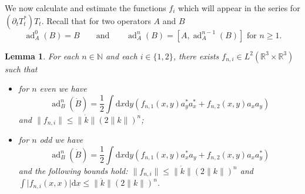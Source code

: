 \documentclass[11pt,a4paper,DIV11]{scrartcl}	%
\newtheorem{lem}[thm]{Lemma}
\newcommand{\ad}{\operatorname{ad}}	%
\newcommand{\di}{\textrm{d}}		%
\newcommand{\Rbb}{\mathbb{R}}		%
\newcommand{\Nbb}{\mathbb{N}}		%
\newcommand{\norm}[1]{\lVert#1\rVert}	%
\newcommand{\bd}{\begin{displaymath}}			%
\newcommand{\ed}{\end{displaymath}}
\begin{document}
We now calculate and estimate the functions $f_i$ which will appear in the series for $(\partial_t T^*_t)T_t$. Recall that for two operators $A$ and $B$
\[
 \ad^0_A(B) = B \qquad \mbox{and} \qquad \ad^n_A(B) = [A,\ad^{n-1}_A(B)] \mbox{ for } n \geq 1.
\]


\begin{lem}
\label{lm:highercommutators}
 For each $n \in \Nbb$ and each $i \in \{1,2\}$, there exists $f_{n,i} \in L^2(\Rbb^3 \times \Rbb^3)$ such that
\begin{itemize}
 \item for $n$ even we have
\bd
\ad^n_B(\dot B) = \frac{1}{2} \int \di x\di y\left( f_{n,1}(x,y) a^\ast_y a^\ast_x + f_{n,2}(x,y) a_x a_y \right)
\ed
and $\norm{f_{n,i}} \leq \norm{\dot k} (2\norm{k})^n$; 
 \item for $n$ odd we have
\bd
\ad^n_B(\dot B) = \frac{1}{2} \int \di x\di y\left( f_{n,1}(x,y) a^\ast_x a_y + f_{n,2}(x,y) a_x a^\ast_y \right)
\ed
and the following bounds hold: $\norm{f_{n,i}} \leq \norm{\dot k} (2\norm{k})^n$ and $\int \lvert f_{n,i}(x,x)\rvert \di x \leq \norm{\dot k} (2\norm{k})^n$. 
\end{itemize}
\end{lem}
\end{document}
